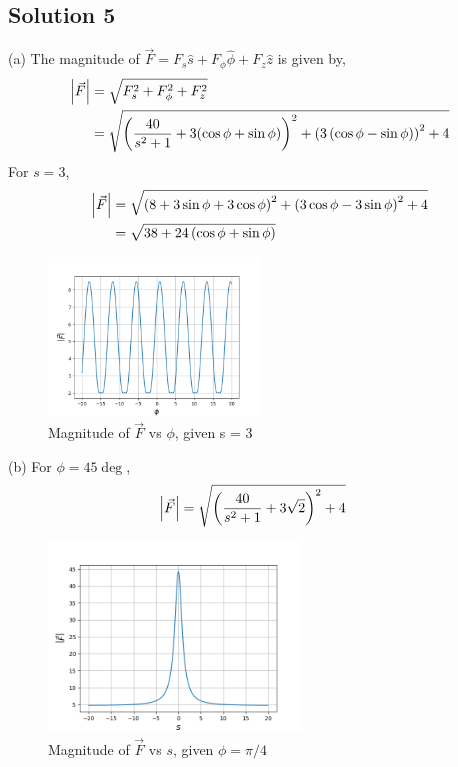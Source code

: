 \documentclass[12pt]{article}
\providecommand{\brak}[1]{\ensuremath{\left(#1\right)}}
\begin{document}
\subsection*{Solution 5}
(a) The magnitude of $\vec{F} = F_s \hat{s} + F_\phi \hat{\phi} + F_z \hat{z}$ is given by,
\begin{align*}
    \abs{\vec{F}} &= \sqrt{F_s^2 + F_\phi^2 + F_z^2}\\
    &= \sqrt{ \brak{\frac{40}{s^2 + 1} + 3(\cos \phi + \sin \phi)}^2 + \brak{3\brak{\cos \phi - \sin \phi}}^2 + 4}
\end{align*}
For $s = 3$,
\begin{align*}
    \abs{\vec{F}} &= \sqrt{\brak{8 + 3 \sin{\phi} + 3\cos{\phi}}^2 + \brak{3\cos{\phi} - 3\sin{\phi}}^2 + 4}\\
    &= \sqrt{38 + 24\brak{\cos{\phi} + \sin{\phi}}}
\end{align*}

\begin{figure}[!ht]
    \begin{center}
        \includegraphics[width=0.5\textwidth]{./q5/a_fig.png}
    \end{center}
    \caption{Magnitude of $\vec{F}$ vs $\phi$, given s = 3}
\end{figure}

(b) For $\phi = 45\deg$,
\begin{align*}
    \abs{\vec{F}} &= \sqrt{\brak{\frac{40}{s^2 + 1} + 3\sqrt{2}}^2 + 4}
\end{align*}
\newpage

\begin{figure}[!ht]
    \begin{center}
        \includegraphics[width=0.6\textwidth]{./q5/b_fig.png}
    \end{center}
    \caption{Magnitude of $\vec{F}$ vs $s$, given $\phi = \pi/4$}
\end{figure}
\end{document}
